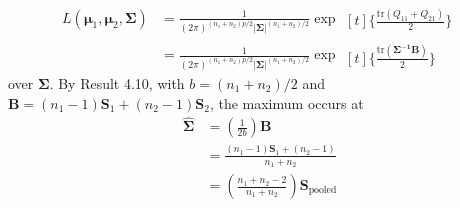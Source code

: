 \begin{align*}
    L(\bm{\mu}_{1}, \bm{\mu}_{2}, \bm{\Sigma})
    & =
    \frac{1}{{(2\pi)}^{(n_{1} + n_{2})p/2}{|\bm{\Sigma}|}^{(n_{1} + n_{2})/2}}
    \exp
    \begin{multlined}[t]
        \Bigg\{
        \frac{\text{tr}(Q_{11} + Q_{21})}{2}
        \Bigg\}
    \end{multlined}
    \\
    & =
    \frac{1}{{(2\pi)}^{(n_{1} + n_{2})p/2}{|\bm{\Sigma}|}^{(n_{1} + n_{2})/2}}
    \exp
    \begin{multlined}[t]
        \Bigg\{
        \frac{\text{tr}(\bm{\Sigma^{-1} \textbf{B}})}{2}
        \Bigg\}
    \end{multlined}
\end{align*}
over $\bm{\Sigma}$. By Result 4.10, with $b = (n_{1} + n_{2})/2$ and $\textbf{B} = (n_{1} - 1) \textbf{S}_{1}
+
(n_{2} - 1) \textbf{S}_{2}$, the maximum occurs at
\begin{align*}
    \hat{\bm{\Sigma}}
    & =
    \left(\frac{1}{2b}\right)
    \textbf{B}
    \\
    & =
    \frac{(n_{1} - 1) \textbf{S}_{1}
    +
    (n_{2} - 1)}{n_{1} + n_{2}}
    \\
    & =
    \left(
        \frac{n_{1} + n_{2} - 2}{n_{1} + n_{2}}
    \right)
    \textbf{S}_{\text{pooled}}
\end{align*}
